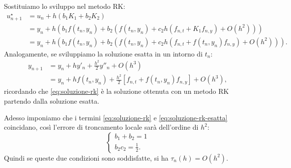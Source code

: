 Sostituiamo lo sviluppo nel metodo RK:
\begin{equation}
\begin{aligned}
u^{\star }_{n+1} & =u_{n} +h( b_{1} K_{1} +b_{2} K_{2})\\
 & =y_{n} +h\left( b_{1} f( t_{n} ,y_{n}) +b_{2}\left( f( t_{n} ,y_{n}) +c_{2} h( f_{n,t} +K_{1} f_{n,y}) +O\left( h^{2}\right)\right)\right)\\
 & =y_{n} +h\left( b_{1} f( t_{n} ,y_{n}) +b_{2}\left( f( t_{n} ,y_{n}) +c_{2} h( f_{n,t} +f( t_{n} ,y_{n}) f_{n,y}) +O\left( h^{2}\right)\right)\right).
\end{aligned}
\label{eq:soluzione-rk}
\end{equation}
Analogamente, se sviluppiamo la soluzione esatta in un intorno di $t_{n}$:
\begin{equation}
\begin{aligned}
y_{n+1} & =y_{n} +hy'_{n} +\frac{h^{2}}{2} y''_{n} +O\left( h^{3}\right)\\
 & =y_{n} +hf( t_{n} ,y_{n}) +\frac{h^{2}}{2}[ f_{n,t} +f( t_{n} ,y_{n}) f_{n,y}] +O\left( h^{3}\right),
\end{aligned}
\label{eq:soluzione-rk-esatta}
\end{equation}
ricordando che \eqref{eq:soluzione-rk} è la soluzione ottenuta con un metodo RK partendo dalla soluzione esatta.

Adesso imponiamo che i termini \eqref{eq:soluzione-rk} e \eqref{eq:soluzione-rk-esatta} coincidano, così l'errore di troncamento locale sarà dell'ordine di $h^{2}$:
\begin{equation*}
\begin{cases}
b_{1} +b_{2} =1\\
b_{2} c_{2} =\frac{1}{2}.
\end{cases}
\end{equation*}
Quindi se queste due condizioni sono soddisfatte, si ha $\tau _{n}(h) =O\left( h^{2}\right)$.

